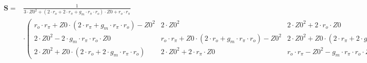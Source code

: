 $\begin{alignedat}{1}\mathbf{S}= & \frac{1}{3\cdot Z0^2+ (2\cdot
r_o+2\cdot r_{\pi}+g_m\cdot r_{\pi}\cdot r_o )\cdot Z0+r_o\cdot
r_{\pi}}\\ & \cdot \left(\begin{smallmatrix} r_o\cdot r_{\pi}+Z0\cdot
(2\cdot r_{\pi}+g_m\cdot r_{\pi}\cdot r_o )-Z0^2 & 2\cdot Z0^2 &
2\cdot Z0^2+2\cdot r_o\cdot Z0 \\ 2\cdot Z0^2-2\cdot g_m\cdot
r_{\pi}\cdot r_o\cdot Z0 & r_o\cdot r_{\pi}+Z0\cdot  (2\cdot
r_o+g_m\cdot r_{\pi}\cdot r_o )-Z0^2 & 2\cdot Z0^2+Z0\cdot  (2\cdot
r_{\pi}+2\cdot g_m\cdot r_{\pi}\cdot r_o ) \\ 2\cdot Z0^2+Z0\cdot
(2\cdot r_o+2\cdot g_m\cdot r_{\pi}\cdot r_o ) & 2\cdot Z0^2+2\cdot
r_{\pi}\cdot Z0 & r_o\cdot r_{\pi}-Z0^2-g_m\cdot r_{\pi}\cdot r_o\cdot
Z0 \end{smallmatrix}\right)\end{alignedat}$
